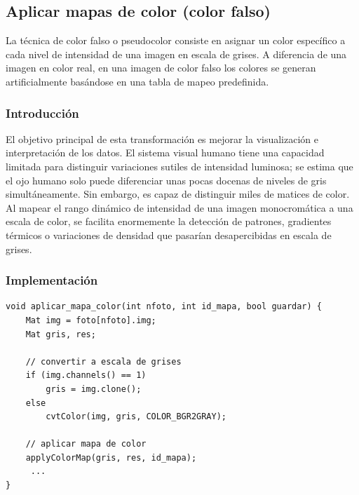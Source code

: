\documentclass[11pt]{article}
\begin{document}
          \clearpage

  \subsection{Aplicar mapas de color (color falso)}

      \noindent
      La técnica de color falso o pseudocolor consiste en asignar un color específico a cada nivel de intensidad de una imagen en escala de grises. A diferencia de una imagen en color real, en una imagen de color falso los colores se generan artificialmente basándose en una tabla de mapeo predefinida.

      \subsubsection{Introducción}

          \noindent
          El objetivo principal de esta transformación es mejorar la visualización e interpretación de los datos. El sistema visual humano tiene una capacidad limitada para distinguir variaciones sutiles de intensidad luminosa; se estima que el ojo humano solo puede diferenciar unas pocas docenas de niveles de gris simultáneamente. Sin embargo, es capaz de distinguir miles de matices de color. \cite{opencv_colormap_group} \\

          Al mapear el rango dinámico de intensidad de una imagen monocromática a una
          escala de color, se facilita enormemente la detección de patrones, gradientes
          térmicos o variaciones de densidad que pasarían desapercibidas en escala de
          grises.

      \subsubsection{Implementación}

          \begin{lstlisting}[style=CppQtStyle]
void aplicar_mapa_color(int nfoto, int id_mapa, bool guardar) {
    Mat img = foto[nfoto].img;
    Mat gris, res;

    // convertir a escala de grises
    if (img.channels() == 1)
        gris = img.clone();
    else
        cvtColor(img, gris, COLOR_BGR2GRAY);

    // aplicar mapa de color
    applyColorMap(gris, res, id_mapa);
     ...
}
\end{lstlisting}
\end{document}
